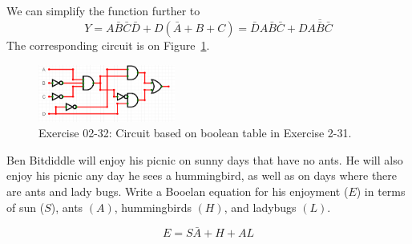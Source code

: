 \documentclass[12pt]{article}
\newenvironment{ex}[2][Exercise]{\begin{trivlist}
		\item[\hskip \labelsep {\bfseries #1}\hskip \labelsep {\bfseries #2.}]}{\end{trivlist}}
\newenvironment{sol}[1][Solution]{\begin{trivlist}
		\item[\hskip \labelsep {\bfseries #1:}]}{\end{trivlist}}
\begin{document}
\begin{sol}
	We can simplify the function further to 
	\[
	Y=A\bar{B}\bar{C}\bar{D}
	+D(\bar{A}+B+C)=\bar{D}A\bar{B}\bar{C}+D\overline{A\bar{B}\bar{C}}
	\]
	The corresponding circuit is on Figure~\ref{02-32-circuit}.
	\begin{figure}
		\centering
		\includegraphics[width=0.4\textwidth]{02-32-circuit}
		\caption{Exercise 02-32: Circuit based on boolean table in
		Exercise 2-31.}
		\label{02-32-circuit}
	\end{figure}
\end{sol}

\begin{ex}{2.33}
	Ben Bitdiddle will enjoy his picnic on sunny days that have no ants.
	He will also enjoy his picnic any day he sees a hummingbird, as well as
	on days where there are ants and lady bugs. Write a Booelan equation
	for his enjoyment ($E$) in terms of sun ($S$), ants $(A)$,
	hummingbirds $(H)$, and ladybugs $(L)$.
\end{ex}

\begin{sol}
	\[
	E=S\bar{A}+H+AL
	\]
\end{sol}
\end{document}

